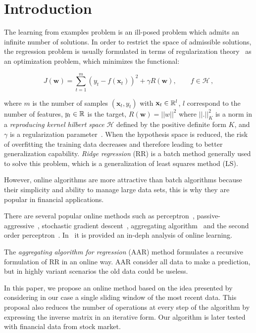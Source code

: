 
\section{Introduction}
The learning from examples problem is an ill-posed problem which
admits an infinite number of solutions.  In order to restrict the
space of admissible solutions, the regression problem is usually
formulated in terms of regularization theory~\cite{girosiETal1995} as
an optimization problem, which minimizes the functional: 

\begin{equation}
\label{eq:problem} 
J(\mathbf{w}) = \sum_{t=1}^m (y_t - f(\mathbf{x}_t))^2 + \gamma R(\mathbf{w})
, \qquad f \in \mathcal{H} \, ,
\end{equation}

\noindent where $m$ is the number of samples $(\mathbf{x}_t ,y_t)$ with
$\mathbf{x}_t \in {\mathbb R }^l$, $l$ correspond to the number of features, $y_t
\in {\mathbb R }$ is the target, $R(\mathbf{w}) = ||w||^2$ where $||.||^2_K$ is a norm in a
{\em reproducing kernel hilbert space} $\mathcal{H}$ defined by the
positive definite form $K$, and $\gamma$ is a regularization
parameter~\cite{evgeniouETal2000}.
When the hypothesis space is reduced, the risk of overfitting the training data
decreases and therefore leading to better generalization capability. 
{\em Ridge regression} (RR) is a batch method generally used to solve this
problem, which is a generalization of least squares method (LS). 


However, online algorithms are more attractive than batch algorithms because
their simplicity and ability to manage large data sets, this is why
they are popular in financial applications.

There are several popular online methods such as
perceptron~\cite{rosenblatt58},
passive-aggressive~\cite{crammerETall2006}, stochastic gradient
descent~\cite{zhang2004}, aggregating algorithm~\cite{vovk2001} and
the second order perceptron~\cite{cesa-bianchi2005}.
In~\cite{cesa-bianchi2006} it is provided an in-deph analysis of
online learning.

The {\em aggregating algorithm for regression} (AAR) method formulates
a recursive formulation of RR in an online way. AAR
consider all data to make a prediction, but in highly variant
scenarios the old data could be useless.

In this paper, we propose an online method based on the idea presented
by~\cite{vovk2001} considering in our case a single sliding window of
the most recent data. This proposal also reduces the number of
operations at every step of the algorithm by expressing the inverse
matrix in an iterative form. Our algorithm is later tested with
financial data from stock market.


